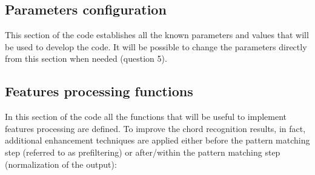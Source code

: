 \documentclass{article}
\begin{document}
\subsection*{Parameters configuration}
This section of the code establishes all the known parameters and values that will be used to develop the code. It will be possible to change the parameters directly from this section when needed (question 5).

\subsection*{Features processing functions}

In this section of the code all the functions that will be useful to implement features processing are defined. To improve the chord recognition results, in fact, additional enhancement techniques are applied either before the pattern matching step (referred to as prefiltering) or after/within the pattern matching step (normalization of the output):
\end{document}
